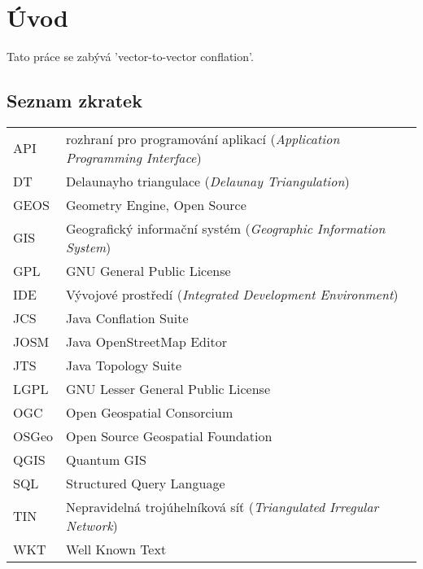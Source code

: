 \chapter{Úvod}
\label{1-uvod}


Tato práce se zabývá 'vector-to-vector conflation'.



\section{Seznam zkratek} %
\label{zkratky}

\begin{tabular}{ll}
API & rozhraní pro programování aplikací (\textit{Application Programming Interface})\\ %
DT & Delaunayho triangulace (\textit{Delaunay Triangulation})\\
GEOS & Geometry Engine, Open Source \\
GIS & Geografický informační systém (\textit{Geographic Information System}) \\
GPL & GNU General Public License \\
IDE & Vývojové prostředí (\textit{Integrated Development Environment})\\
JCS & Java Conflation Suite \\
JOSM & Java OpenStreetMap Editor \\
JTS & Java Topology Suite \\
LGPL & GNU Lesser General Public License \\
OGC & Open Geospatial Consorcium \\
OSGeo & Open Source Geospatial Foundation \\
QGIS & Quantum GIS \\
SQL & Structured Query Language \\
TIN & Nepravidelná trojúhelníková síť (\textit{Triangulated Irregular Network}) \\
WKT & Well Known Text \\  %
\end{tabular}

